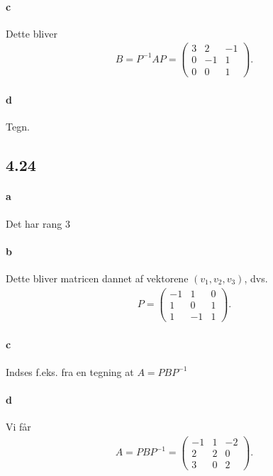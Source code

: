 			\paragraph{c} Dette bliver
				\begin{align*}
					B = P^{-1}AP = \left(\begin{array}{rrr} {3} & {2} & {-1} \\ {0} & {-1} & {1} \\ 0 & 0 & 1 \end{array}\right).
				\end{align*} 

			\paragraph{d} Tegn.

		\subsection{4.24}

			\paragraph{a} Det har rang $3$

			\paragraph{b} Dette bliver matricen dannet af vektorene $(v_1,v_2,v_3)$, dvs.
			    \begin{align*}
					P=\left(\begin{array}{rrr} -1 & 1 & 0 \\ 1 & 0 & 1 \\ 1 & -1 & 1 \end{array}\right).
				\end{align*}

			\paragraph{c} Indses f.eks. fra en tegning at $A=PBP^{-1}$

			\paragraph{d} Vi får
				\begin{align*}
					A = PBP^{-1} = \left(\begin{array}{rrr} {-1} & {1} & {-2} \\ {2} & {2} & {0} \\ 3 & 0 & 2 \end{array}\right).
				\end{align*}
				
